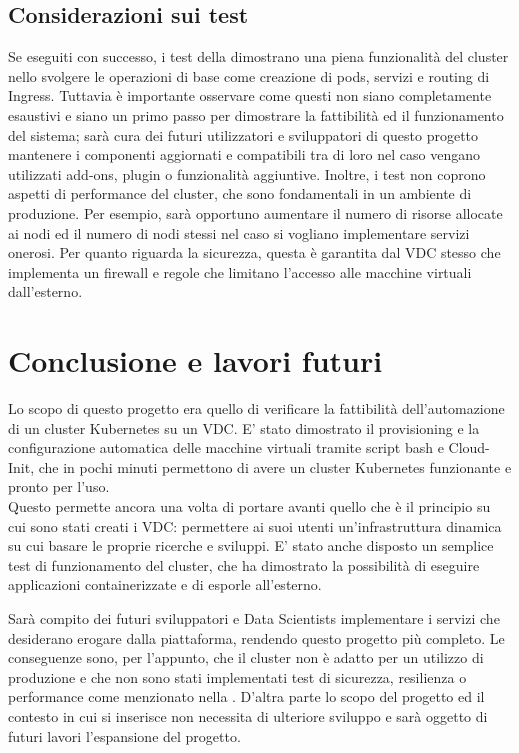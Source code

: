 \documentclass[12pt,a4paper,openright,twoside]{book}
\begin{document}
\section{Considerazioni sui test}
\label{sec:test-concl}
Se eseguiti con successo, i test della  dimostrano una piena funzionalità del cluster nello svolgere le operazioni di base come creazione di pods, servizi e routing di Ingress.
Tuttavia è importante osservare come questi non siano completamente esaustivi e siano un primo passo per dimostrare la fattibilità ed il funzionamento del sistema; sarà cura dei futuri utilizzatori e sviluppatori di questo progetto mantenere i componenti aggiornati e compatibili tra
di loro nel caso vengano utilizzati add-ons, plugin o funzionalità aggiuntive.
Inoltre, i test non coprono aspetti di performance del cluster, che sono fondamentali in un ambiente di produzione. Per esempio, sarà opportuno 
aumentare il numero di risorse allocate ai nodi ed il numero di nodi stessi nel caso si vogliano implementare servizi onerosi. 
Per quanto riguarda la sicurezza, questa è garantita dal VDC stesso che implementa un firewall e regole che limitano l'accesso alle macchine virtuali dall'esterno.
%
\chapter{Conclusione e lavori futuri}
Lo scopo di questo progetto era quello di verificare la fattibilità dell'automazione di un cluster Kubernetes su un VDC. 
E' stato dimostrato il provisioning e la configurazione automatica delle macchine virtuali tramite script bash e Cloud-Init, che in pochi minuti permettono di 
avere un cluster Kubernetes funzionante e pronto per l'uso.\\
Questo permette ancora una volta di portare avanti quello che è il principio su cui sono stati creati i VDC: permettere ai suoi utenti un'infrastruttura dinamica
su cui basare le proprie ricerche e sviluppi.
E' stato anche disposto un semplice test di funzionamento del cluster, che ha dimostrato la possibilità di eseguire applicazioni containerizzate e di esporle all'esterno.

Sarà compito dei futuri sviluppatori e Data Scientists implementare i servizi che desiderano erogare dalla piattaforma, rendendo questo progetto più completo.
Le conseguenze sono, per l'appunto, che il cluster non è adatto per un utilizzo di produzione e che non sono stati implementati test di sicurezza, resilienza o performance
come menzionato nella .
D'altra parte lo scopo del progetto ed il contesto in cui si inserisce non necessita di ulteriore sviluppo e sarà oggetto di futuri lavori l'espansione del progetto.
\end{document}

